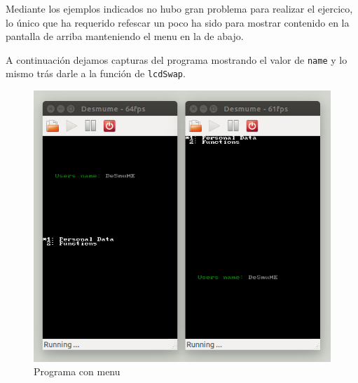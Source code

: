 Mediante los ejemplos indicados no hubo gran problema para realizar el ejercico, lo único que ha requerido refescar un poco ha sido para mostrar contenido en la pantalla de arriba manteniendo el menu en la de abajo.

A continuación dejamos capturas del programa mostrando el valor de \texttt{name} y lo mismo trás darle a la función de \texttt{lcdSwap}.

\begin{figure}[H] 
\centering
\includegraphics[scale=0.35]{P2Media/prog.png}
\caption{Programa con menu}
\end{figure}
